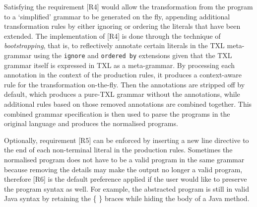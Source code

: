 \documentclass[10pt, conference, compsocconf]{IEEEtran}
\begin{document}
Satisfying the requirement [R4] would allow the transformation from the program to a `simplified' grammar to be generated on the fly, appending additional transformation rules by either ignoring or ordering the literals that have been extended.  The implementation of [R4] is done through the technique of {\em bootstrapping}, that is, to reflectively annotate certain literals in the TXL meta-grammar using the {\tt ignore} and {\tt ordered by} extensions given that the TXL grammar itself is expressed in TXL as a meta-grammar. By processing each annotation in the context of the production rules, it produces a context-aware rule for the transformation on-the-fly. Then the annotations are stripped off by default, which produces a pure-TXL grammar without the annotations, while additional rules based on those removed annotations are combined together. This combined grammar specification is then used to parse the programs in the original language and produces the normalised programs. 

Optionally, requirement [R5] can be  enforced by inserting a new line directive  {\tt \underbar {[NL]}} to the end of each non-terminal literal in the production rules. Sometimes the normalised program does not have to be a valid program in the same grammar because removing the details may make the output no longer a valid program, therefore [R6] is the default preference applied if the user would like to preserve the program syntax as well. For example, the abstracted program is still in valid Java syntax by retaining the \{ \} braces while hiding the body of a Java method.
\end{document}
